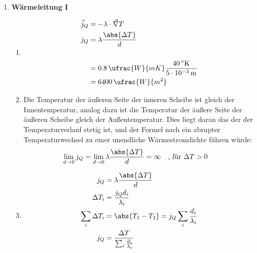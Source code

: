 \documentclass[11pt,letterpaper]{article}
\begin{document}
\begin{enumerate}
  \item \textbf{Wärmeleitung I}
    \begin{enumerate}
      \item
        \begin{align*}
          \vec{j}_Q &= -\lambda\cdot \vec{\nabla}T\\
          j_Q&= \lambda \frac{\abs{\Delta T}}{d}\\
          \\
          &= 0.8\,\ufrac{W}{mK} \frac{40\,^\circ\mathrm{K}}{5\cdot 10^{-3}\, \mathrm{m}}\\
          &= 6400\,\ufrac{W}{m^2}
        \end{align*}

      \item
        Die Temperatur der äußeren Seite der inneren Scheibe ist gleich der Innentemperatur,
        analog dazu ist die Temperatur der äußere Seite der äußeren Scheibe gleich der Außentemperatur.
        Dies liegt daran das der der Temperaturverlauf stetig ist, und der Formel nach ein 
        abrupter Temperaturwechsel zu einer unendliche Wärmestromdichte führen würde:
        \begin{align*}
          \lim_{d\to 0}j_Q &= \lim_{d\to 0}\lambda \frac{\abs{\Delta T}}{d} = \infty \quad \text{, für } \Delta T >0
        \end{align*}

      \item
        \begin{align*}
          j_Q&= \lambda \frac{\abs{\Delta T}}{d}\\
          \Delta T_{i} &= \frac{j_Q d_i}{\lambda_i}\\
          \sum_{i} \Delta T_{i} &= \abs{T_1 - T_2} = j_Q \sum_i \frac{ d_i}{\lambda_i}\\
          j_Q &= \frac{\Delta T}{ \sum_i \frac{ d_i}{\lambda_i}}\\
          \\
        \end{align*}
    \end{enumerate}


\end{enumerate}
\end{document}
